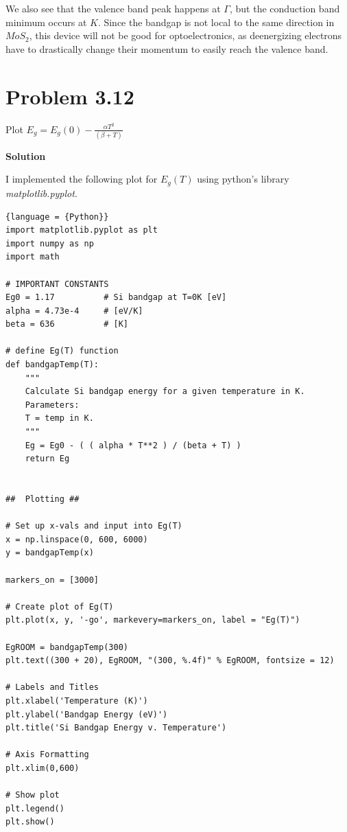 \documentclass{article}
\begin{document}
\smallskip

We also see that the valence band peak happens at \(\Gamma\), but the conduction band minimum occurs at \(K\). Since the bandgap is not local to the same direction in \(MoS_2\), this device will not be good for optoelectronics, as deenergizing electrons have to drastically change their momentum to easily reach the valence band. 

\section*{Problem 3.12}

Plot \(E_g = E_g(0) - \frac{\alpha T^2}{(\beta + T)}\) \bigskip

\textbf{Solution}

I implemented the following plot for \(E_g(T)\) using python's library \textit{matplotlib.pyplot}.

\begin{lstlisting}{language = {Python}}
import matplotlib.pyplot as plt
import numpy as np
import math

# IMPORTANT CONSTANTS
Eg0 = 1.17          # Si bandgap at T=0K [eV]
alpha = 4.73e-4     # [eV/K]
beta = 636          # [K]

# define Eg(T) function
def bandgapTemp(T):
    """
    Calculate Si bandgap energy for a given temperature in K.
    Parameters:
    T = temp in K.
    """
    Eg = Eg0 - ( ( alpha * T**2 ) / (beta + T) )
    return Eg


##  Plotting ##

# Set up x-vals and input into Eg(T)
x = np.linspace(0, 600, 6000)
y = bandgapTemp(x)

markers_on = [3000]

# Create plot of Eg(T)
plt.plot(x, y, '-go', markevery=markers_on, label = "Eg(T)")

EgROOM = bandgapTemp(300)
plt.text((300 + 20), EgROOM, "(300, %.4f)" % EgROOM, fontsize = 12)

# Labels and Titles
plt.xlabel('Temperature (K)')
plt.ylabel('Bandgap Energy (eV)')
plt.title('Si Bandgap Energy v. Temperature')

# Axis Formatting
plt.xlim(0,600)

# Show plot
plt.legend()
plt.show()
\end{lstlisting}
\end{document}
